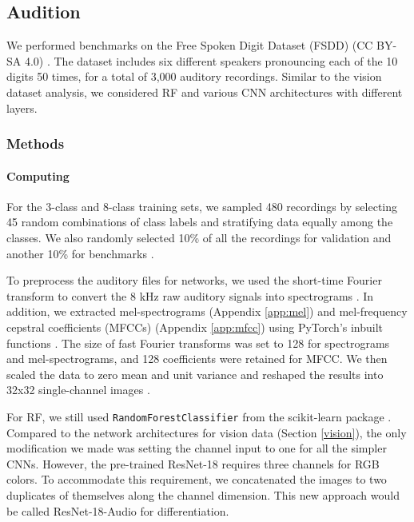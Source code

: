 \subsection{Audition}
\label{audition}
We performed benchmarks on the Free Spoken Digit Dataset (FSDD) (CC BY-SA 4.0) \citep{FSDD}. The dataset includes six different speakers pronouncing each of the 10 digits 50 times, for a total of 3,000 auditory recordings. Similar to the vision dataset analysis, we considered RF and various CNN architectures with different layers.

\subsubsection{Methods}
\paragraph{Computing}
For the 3-class and 8-class training sets, we sampled 480 recordings by selecting 45 random combinations of class labels and stratifying data equally among the classes. We also randomly selected 10\% of all the recordings for validation and another 10\% for benchmarks \citep{nasr, tian}.

To preprocess the auditory files for networks, we used the short-time Fourier transform to convert the 8 kHz raw auditory signals into spectrograms \citep{wyse}. In addition, we extracted mel-spectrograms (Appendix \ref{app:mel}) and mel-frequency cepstral coefficients (MFCCs) (Appendix \ref{app:mfcc}) using PyTorch's inbuilt functions \citep{pytorch}.
The size of fast Fourier transforms was set to 128 for spectrograms and mel-spectrograms, and 128 coefficients were retained for MFCC. We then scaled the data to zero mean and unit variance and reshaped the results into 32x32 single-channel images \citep{lecun2012efficient}. 

For RF, we still used \texttt{RandomForestClassifier} from the scikit-learn package \citep{scikit-learn}. Compared to the network architectures for vision data (Section \ref{vision}), the only modification we made was setting the channel input to one for all the simpler CNNs. However, the pre-trained ResNet-18 requires three channels for RGB colors. To accommodate this requirement, we concatenated the images to two duplicates of themselves along the channel dimension. This new approach would be called ResNet-18-Audio for differentiation.

